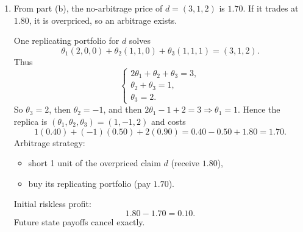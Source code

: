 \documentclass[12pt]{article}
\begin{document}
\begin{enumerate}[label=(\alph*)]
\item From part (b), the no-arbitrage price of $d=(3,1,2)$ is $1.70$.
If it trades at $1.80$, it is overpriced, so an arbitrage exists.

One replicating portfolio for $d$ solves
\[
\theta_1(2,0,0)+\theta_2(1,1,0)+\theta_3(1,1,1)=(3,1,2).
\]
Thus
\[
\begin{cases}
2\theta_1+\theta_2+\theta_3=3,\\
\theta_2+\theta_3=1,\\
\theta_3=2.
\end{cases}
\]
So $\theta_3=2$, then $\theta_2=-1$, and then $2\theta_1-1+2=3\Rightarrow \theta_1=1$.
Hence the replica is $(\theta_1,\theta_2,\theta_3)=(1,-1,2)$ and costs
\[
1(0.40)+(-1)(0.50)+2(0.90)=0.40-0.50+1.80=1.70.
\]
Arbitrage strategy:
\begin{itemize}[leftmargin=*]
\item short 1 unit of the overpriced claim $d$ (receive $1.80$),
\item buy its replicating portfolio (pay $1.70$).
\end{itemize}
Initial riskless profit:
\[
1.80-1.70=\boxed{0.10}.
\]
Future state payoffs cancel exactly.
\end{enumerate}
\end{document}
